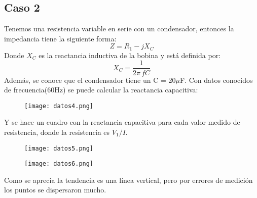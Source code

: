 \documentclass[a4paper,12pt]{report}
\begin{document}
\begin{enumerate}
\subsection*{Caso 2}
Tenemos una resistencia variable en serie con un condensador, entonces la impedancia tiene la siguiente forma:
$$
Z = R_{1} - jX_{C}
$$
Donde $X_{C}$ es la reactancia inductiva de la bobina y está definida por:
$$
X_{C} = \frac{1}{2\pi\, f C}
$$
Además, se conoce que el condensador tiene un C = 20$\mu$F. Con datos conocidos de frecuencia(60Hz) se puede calcular la reactancia capacitiva:
\begin{figure}[H]
\centering
\texttt{[image: datos4.png]}
\end{figure}
Y se hace un cuadro con la reactancia capacitiva para cada valor medido de resistencia, donde la resistencia es $V_{1}/I$.
\begin{figure}[H]
\centering
\texttt{[image: datos5.png]}
\end{figure}
\begin{figure}[H]
\centering
\texttt{[image: datos6.png]}
\end{figure}
Como se aprecia la tendencia es una línea vertical, pero por errores de medición los puntos se dispersaron mucho.

\end{enumerate}
\end{document}
